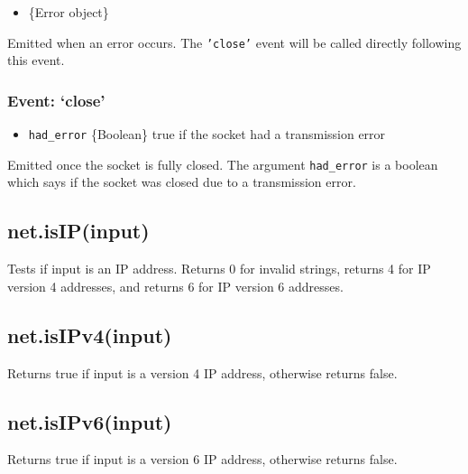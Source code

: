 \begin{itemize}
\itemsep1pt\parskip0pt
\item
  \{Error object\}
\end{itemize}

Emitted when an error occurs. The \texttt{'close'} event will be called
directly following this event.

\subsubsection{Event: `close'}\label{event-close-1}

\begin{itemize}
\itemsep1pt\parskip0pt
\item
  \texttt{had\_error} \{Boolean\} true if the socket had a transmission
  error
\end{itemize}

Emitted once the socket is fully closed. The argument
\texttt{had\_error} is a boolean which says if the socket was closed due
to a transmission error.

\subsection{net.isIP(input)}\label{net.isipinput}

Tests if input is an IP address. Returns 0 for invalid strings, returns
4 for IP version 4 addresses, and returns 6 for IP version 6 addresses.

\subsection{net.isIPv4(input)}\label{net.isipv4input}

Returns true if input is a version 4 IP address, otherwise returns
false.

\subsection{net.isIPv6(input)}\label{net.isipv6input}

Returns true if input is a version 6 IP address, otherwise returns
false.
